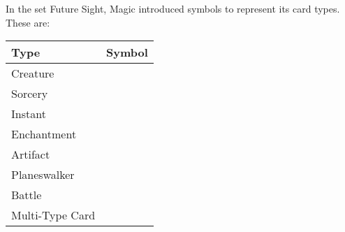 \documentclass[a4paper]{scrartcl}
\begin{document}
	In the set Future Sight, Magic introduced symbols to represent its card types.
	These are:
	\begin{table}[h]
		\begin{tabular}{l c}
			\hline
			\textbf{Type} & \textbf{Symbol} \\
			\hline
			Creature & \mtgTypeCreature \\
			Sorcery & \mtgTypeSorcery \\
			Instant & \mtgTypeInstant \\
			Enchantment & \mtgTypeEnchantment \\
			Artifact & \mtgTypeArtifact \\
			Planeswalker & \mtgTypePlaneswalker \\
			Battle & \mtgTypeBattle \\
			Multi-Type Card & \mtgTypeMulti \\
			\hline
		\end{tabular}
	\end{table}
\end{document}
